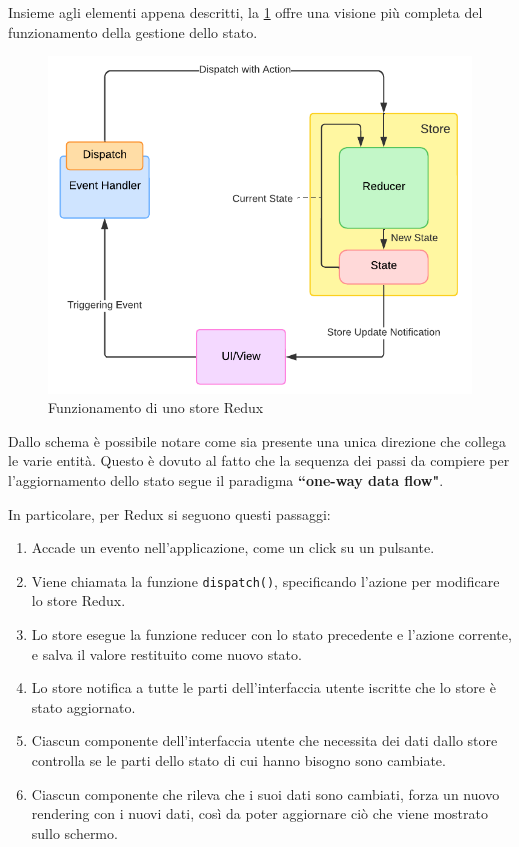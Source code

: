 Insieme agli elementi appena descritti, la \cref{fig:redux-scheme} offre una visione più completa del funzionamento della gestione dello stato.
\begin{figure}[htb]
	\centering
	\includegraphics[scale=0.8]{imgs/Redux_Scheme.pdf}
	\caption{Funzionamento di uno store Redux}
	\label{fig:redux-scheme}
\end{figure}


Dallo schema è possibile notare come sia presente una unica direzione che collega le varie entità. Questo è dovuto al fatto che la sequenza dei passi da compiere per l'aggiornamento dello stato segue il paradigma \textbf{``one-way data flow"}.

 In particolare, per Redux si seguono questi passaggi:
\begin{enumerate}	
	\item Accade un evento nell'applicazione, come un click su un pulsante.
	\item Viene chiamata la funzione \texttt{dispatch()}, specificando l'azione per modificare lo store Redux.
	\item Lo store esegue la funzione reducer con lo stato precedente e l'azione corrente, e salva il valore restituito come nuovo stato.
	\item Lo store notifica a tutte le parti dell'interfaccia utente iscritte che lo store è stato aggiornato.
	\item Ciascun componente dell'interfaccia utente che necessita dei dati dallo store controlla se le parti dello stato di cui hanno bisogno sono cambiate.
	\item Ciascun componente che rileva che i suoi dati sono cambiati, forza un nuovo rendering con i nuovi dati, così da poter aggiornare ciò che viene mostrato sullo schermo.
\end{enumerate}
